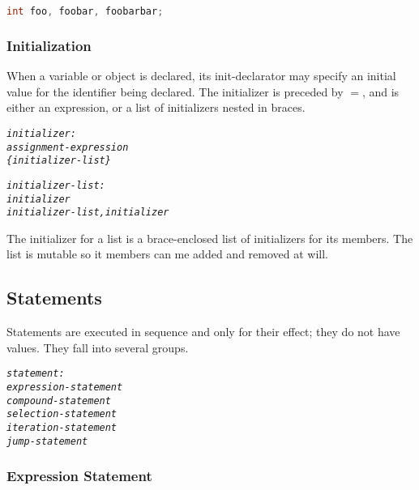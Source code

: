 \documentclass[12pt]{report}
\begin{document}
\begin{singlespace}
\begin{lstlisting}[language=Java,label=some-code,caption=foo declaration]
int foo, foobar, foobarbar;
\end{lstlisting}
\end{singlespace}

\subsubsection{Initialization}

When a variable or object is declared, its init-declarator may specify an initial value for the identifier being declared. The initializer is preceded by $=$, and is either an expression, or a list of initializers nested in braces.

\begin{alltt}\begin{singlespace}
         \textit{initializer:}
              \textit{assignment-expression}
              \textit{\{ initializer-list \}}
              
         \textit{initializer-list:}
              \textit{initializer}
              \textit{initializer-list , initializer}\end{singlespace}
\end{alltt}

The initializer for a list is a brace-enclosed list of initializers for its members. The list is mutable so it members can me added and removed at will.

\subsection{Statements}

Statements are executed in sequence and only for their effect; they do not have values. They fall into several groups.

\begin{alltt}\begin{singlespace}
         \textit{statement:}
              \textit{expression-statement}
              \textit{compound-statement}
              \textit{selection-statement}
              \textit{iteration-statement}
              \textit{jump-statement}\end{singlespace}
\end{alltt}

\subsubsection{Expression Statement}
\end{document}
